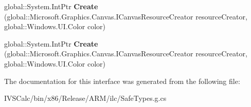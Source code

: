 \begin{DoxyCompactItemize}
global\+::\+System.\+Int\+Ptr {\bfseries Create} (global\+::\+Microsoft.\+Graphics.\+Canvas.\+I\+Canvas\+Resource\+Creator resource\+Creator, global\+::\+Windows.\+U\+I.\+Color color)
\item 
\mbox{\label{interface_microsoft_1_1_graphics_1_1_canvas_1_1_brushes_1_1_i_canvas_solid_color_brush_factory_a6b5d12f659a021a3ef3b39738a0c5d28}} 
global\+::\+System.\+Int\+Ptr {\bfseries Create} (global\+::\+Microsoft.\+Graphics.\+Canvas.\+I\+Canvas\+Resource\+Creator resource\+Creator, global\+::\+Windows.\+U\+I.\+Color color)
\end{DoxyCompactItemize}


The documentation for this interface was generated from the following file\+:\begin{DoxyCompactItemize}
\item 
I\+V\+S\+Calc/bin/x86/\+Release/\+A\+R\+M/ilc/Safe\+Types.\+g.\+cs\end{DoxyCompactItemize}
